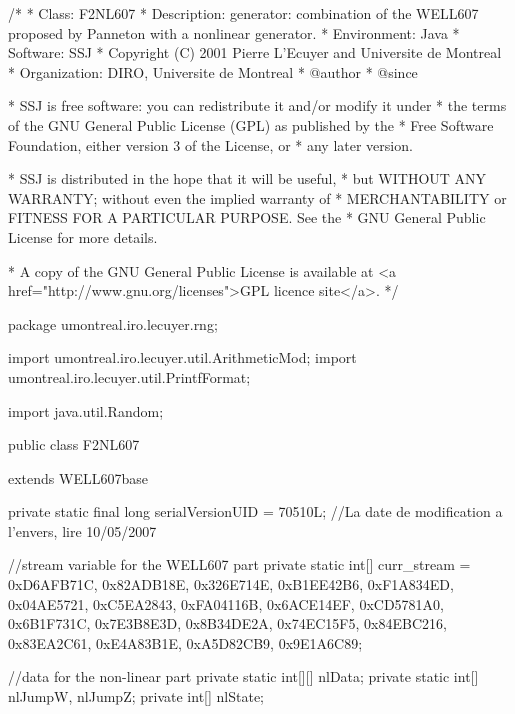 \begin{code}
\begin{hide}
/*
 * Class:        F2NL607
 * Description:  generator: combination of the WELL607 proposed by
                 Panneton with a nonlinear generator.
 * Environment:  Java
 * Software:     SSJ
 * Copyright (C) 2001  Pierre L'Ecuyer and Universite de Montreal
 * Organization: DIRO, Universite de Montreal
 * @author
 * @since

 * SSJ is free software: you can redistribute it and/or modify it under
 * the terms of the GNU General Public License (GPL) as published by the
 * Free Software Foundation, either version 3 of the License, or
 * any later version.

 * SSJ is distributed in the hope that it will be useful,
 * but WITHOUT ANY WARRANTY; without even the implied warranty of
 * MERCHANTABILITY or FITNESS FOR A PARTICULAR PURPOSE.  See the
 * GNU General Public License for more details.

 * A copy of the GNU General Public License is available at
   <a href="http://www.gnu.org/licenses">GPL licence site</a>.
 */
\end{hide}
package umontreal.iro.lecuyer.rng; \begin{hide}

import umontreal.iro.lecuyer.util.ArithmeticMod;
import umontreal.iro.lecuyer.util.PrintfFormat;

import java.util.Random;
\end{hide}

public class F2NL607 \begin{hide} extends WELL607base {

   private static final long serialVersionUID = 70510L;
   //La date de modification a l'envers, lire 10/05/2007

   //stream variable for the WELL607 part
   private static int[] curr_stream = {0xD6AFB71C, 0x82ADB18E, 0x326E714E,
                                       0xB1EE42B6, 0xF1A834ED, 0x04AE5721,
                                       0xC5EA2843, 0xFA04116B, 0x6ACE14EF,
                                       0xCD5781A0, 0x6B1F731C, 0x7E3B8E3D,
                                       0x8B34DE2A, 0x74EC15F5, 0x84EBC216,
                                       0x83EA2C61, 0xE4A83B1E, 0xA5D82CB9,
                                       0x9E1A6C89};

   //data for the non-linear part
   private static int[][] nlData;
   private static int[] nlJumpW, nlJumpZ;
   private int[] nlState;

}
\end{hide}
\end{code}
